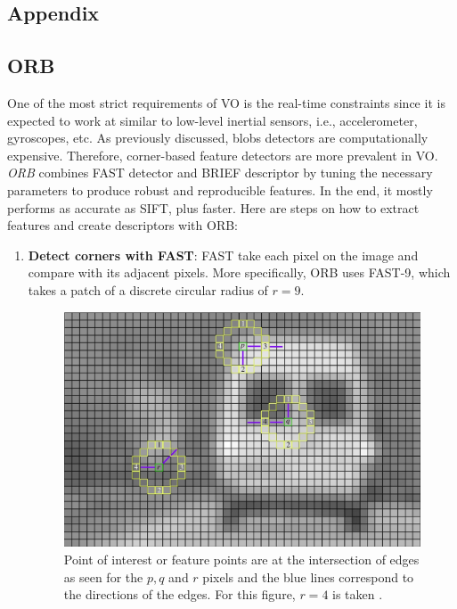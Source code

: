 \documentclass[a4paper]{report}
\numberwithin{figure}{section}
\begin{document}


\begin{appendices}

\chapter{Appendix} \label{cp_appendices}

\section{ORB} \label{sb_sc_orb}

One of the most strict requirements of VO is the real-time constraints since 
it is expected to work at similar to low-level inertial sensors, i.e., 
accelerometer, gyroscopes, etc.  As previously discussed, blobs detectors are 
computationally expensive. Therefore, corner-based feature detectors are more 
prevalent in VO.  \textit{ORB} \parencite{Rublee2011a} combines FAST detector 
\parencite{Rosten2006} and BRIEF descriptor \parencite{M.2010} by tuning the 
necessary 
parameters to produce robust and reproducible features.  In the end, it mostly 
performs as accurate as SIFT, plus faster. Here are steps on how to extract 
features and create descriptors with ORB: 

\begin{enumerate}
	\item \textbf{Detect corners with FAST}: FAST take each pixel on 
	the image and compare with its adjacent pixels. More specifically, 
	ORB uses FAST-9, which takes a patch of a discrete circular radius of 
	$r=9$. 
	\begin{figure}[H]
		\centering
		\includegraphics[width=0.7\linewidth,natwidth=640,natheight=640]
		{fig/ref_imgs/fast.png}
		\caption[FAST Corners]
		{Point of interest or feature points are at the intersection of edges 
			as seen for the $p,q$ and $r$ pixels and the blue lines correspond 
			to 
			the directions of the edges. For this figure, $r=4$ is taken 
			\parencite{Klette2014}.}
		\label{fig:fast_corners}
	\end{figure}
	

\end{enumerate}
\end{appendices}
\end{document}
